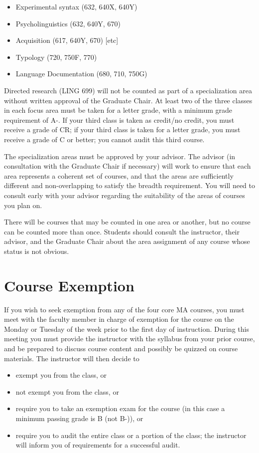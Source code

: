 \documentclass[
]{book}
\providecommand{\tightlist}{%
  \setlength{\itemsep}{0pt}\setlength{\parskip}{0pt}}
\begin{document}
\begin{itemize}
\tightlist
\item
  Experimental syntax (632, 640X, 640Y)
\item
  Psycholinguistics (632, 640Y, 670)
\item
  Acquisition (617, 640Y, 670) {[}etc{]}
\item
  Typology (720, 750F, 770)
\item
  Language Documentation (680, 710, 750G)
\end{itemize}

Directed research (LING 699) will not be counted as part of a specialization area without written approval of the Graduate Chair. At least two of the three classes in each focus area must be taken for a letter grade, with a minimum grade requirement of A-. If your third class is taken as credit/no credit, you must receive a grade of CR; if your third class is taken for a letter grade, you must receive a grade of C or better; you cannot audit this third course.

The specialization areas must be approved by your advisor. The advisor (in consultation with the Graduate Chair if necessary) will work to ensure that each area represents a coherent set of courses, and that the areas are sufficiently different and non-overlapping to satisfy the breadth requirement. You will need to consult early with your advisor regarding the suitability of the areas of courses you plan on.

There will be courses that may be counted in one area or another, but no course can be counted more than once. Students should consult the instructor, their advisor, and the Graduate Chair about the area assignment of any course whose status is not obvious.

\section{Course Exemption}\label{course-exemption}

If you wish to seek exemption from any of the four core MA courses, you must meet with the faculty member in charge of exemption for the course on the Monday or Tuesday of the week prior to the first day of instruction. During this meeting you must provide the instructor with the syllabus from your prior course, and be prepared to discuss course content and possibly be quizzed on course materials. The instructor will then decide to

\begin{itemize}
\tightlist
\item
  exempt you from the class, or
\item
  not exempt you from the class, or
\item
  require you to take an exemption exam for the course (in this case a minimum passing grade is B (not B-)), or
\item
  require you to audit the entire class or a portion of the class; the instructor will inform you of requirements for a successful audit.
\end{itemize}
\end{document}
